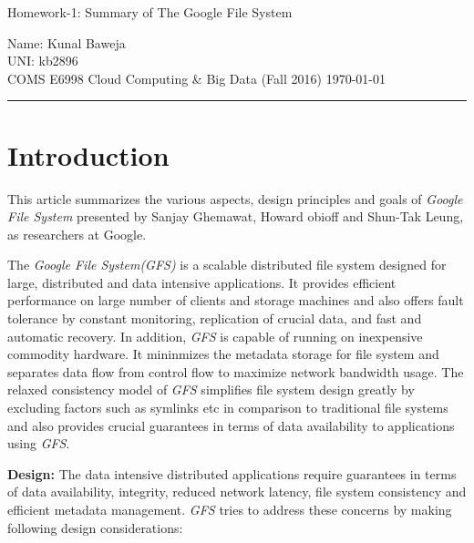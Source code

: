\documentclass[12pt, a4paper]{article}
\def\name{Kunal Baweja}
\def\uni{kb2896}
\def\assignment{Homework-1: Summary of The Google File System}
\def\subject{COMS E6998 Cloud Computing \& Big Data (Fall 2016)}
\begin{document}
\begin{center}
    {\Large \assignment}
    \vspace{0.1em}
\end{center}

Name: {\name}\\
UNI: {\uni}\\
{\subject} \hfill {\today}

\rule{\textwidth}{0.2pt}

\section*{Introduction}
This article summarizes the various aspects, design principles and goals of \textit{Google File System}\cite{Ghemawat:2003:GFS:945445.945450} presented by Sanjay Ghemawat, Howard obioff and Shun-Tak Leung, as researchers at Google.\par

The \textit{Google File System(GFS)}\cite{Ghemawat:2003:GFS:945445.945450} is a scalable distributed file system designed for large, distributed and data intensive applications. It provides efficient performance on large number of clients and storage machines and also offers fault tolerance by constant monitoring, replication of crucial data, and fast and automatic recovery. In addition, \textit{GFS}\cite{Ghemawat:2003:GFS:945445.945450} is capable of running on inexpensive commodity hardware. It mininmizes the metadata storage for file system and separates data flow from control flow to maximize network bandwidth usage. The relaxed consistency model of \textit{GFS}\cite{Ghemawat:2003:GFS:945445.945450} simplifies file system design greatly by excluding factors such as symlinks etc in comparison to traditional file systems and also provides crucial guarantees in terms of data availability to applications using \textit{GFS}\cite{Ghemawat:2003:GFS:945445.945450}.\par

\textbf{Design:} The data intensive distributed applications require guarantees in terms of data availability, integrity, reduced network latency, file system consistency and efficient metadata management. \textit{GFS}\cite{Ghemawat:2003:GFS:945445.945450} tries to address these concerns by making following design considerations:
\end{document}
